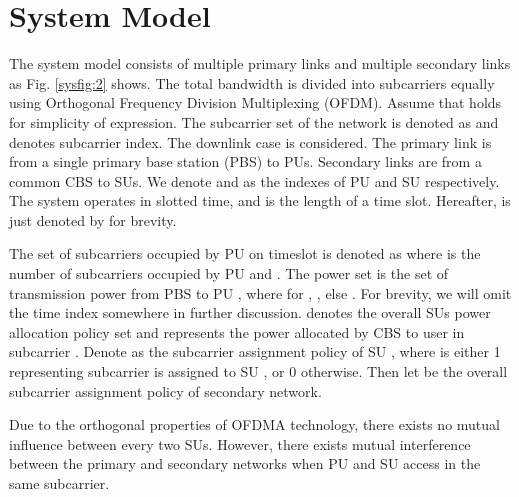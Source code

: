 \documentclass[journal]{IEEEtran}
\begin{document}
\section{System Model}
{ The system model consists of  multiple primary  links and multiple secondary links as Fig. \ref{sysfig:2} shows. The total
bandwidth  is divided into  subcarriers equally using Orthogonal Frequency Division Multiplexing (OFDM). Assume that  holds for simplicity of expression. The subcarrier set of the network is denoted as  and  denotes subcarrier index. The downlink case is considered. The primary
link is from a single primary base station (PBS) to  PUs. Secondary links are from a common CBS to  SUs. We denote  and  as the indexes of PU and SU respectively.
The system operates in slotted time, and  is the length of a time slot. Hereafter,  is just denoted by  for  brevity.}

The set of subcarriers occupied by PU  on timeslot  is denoted as
 where  is the number of subcarriers occupied
by PU  and . The power
set  is the set of transmission power from PBS to PU , where for , , else . For brevity, we will omit the time index  somewhere in further discussion.
 denotes the overall SUs power allocation policy set and 
 represents the power allocated by CBS to user  in subcarrier . Denote  as the subcarrier
assignment
policy of SU , where  is either 1 representing subcarrier  is assigned to SU , or 0 otherwise.
Then let  be the overall subcarrier assignment policy of secondary network.

{Due to the orthogonal properties of OFDMA
technology, there exists no mutual influence between every two SUs. However, there exists mutual interference between the primary and secondary networks when PU and SU access in the same subcarrier.}
\end{document}
